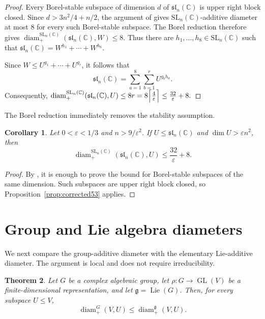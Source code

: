 \documentclass[11pt]{article}
\newtheorem{theorem}{Theorem}[section]
\newtheorem{corollary}[theorem]{Corollary}
\theoremstyle{remark}
\newcommand{\C}{\mathbb C}
\begin{document}
\begin{proof}
Every Borel-stable subspace of dimension $d$ of
$\mathfrak{sl}_n(\C)$ is upper right block closed.  Since
$d>3n^2/4+n/2$, the argument of
\cite[Lemma~5.1 and Proposition~5.2]{JezernikSpenko} gives
$\mathrm{SL}_n(\C)$-additive diameter at most $8$ for every such
Borel-stable subspace.  The Borel reduction
\cite[Proposition~2.3]{JezernikSpenko} therefore gives $\operatorname{diam}^{\mathrm{SL}_n(\C)}_{+}
 (\mathfrak{sl}_n(\C),W)\leq8.$
Thus there are $h_1,\ldots,h_8\in\mathrm{SL}_n(\C)$ such that $\mathfrak{sl}_n(\C)=W^{h_1}+\cdots+W^{h_8}.$

Since $W\leq U^{g_1}+\cdots+U^{g_r}$, it follows that
\[
 \mathfrak{sl}_n(\C)
=
 \sum_{a=1}^{8}\sum_{b=1}^{r}U^{g_bh_a}.
\]
Consequently, $\operatorname{diam}^{\mathrm{SL}_n(\C)}_{+}
 (\mathfrak{sl}_n(\C),U)
 \leq 8r
 =8\Bigl\lceil\frac4\varepsilon\Bigr\rceil
 \leq\frac{32}{\varepsilon}+8.$
\end{proof}

The Borel reduction immediately removes the stability assumption.

\begin{corollary}\label{cor:allsubspaces}
Let $0<\varepsilon<1/3$ and $n>9/\varepsilon^2$.  If
$U\leq\mathfrak{sl}_n(\C)$ and $\dim U>\varepsilon n^2$, then
\[
 \operatorname{diam}^{\mathrm{SL}_n(\C)}_{+}
 (\mathfrak{sl}_n(\C),U)
 \leq\frac{32}{\varepsilon}+8.
\]
\end{corollary}

\begin{proof}
By \cite[Proposition~2.3]{JezernikSpenko}, it is enough to prove the
bound for Borel-stable subspaces of the same dimension.  Such subspaces are
upper right block closed, so Proposition~\ref{prop:corrected53} applies.
\end{proof}

\section{Group and Lie algebra diameters}

We next compare the group-additive diameter with the elementary Lie-additive
diameter.  The argument is local and does not require irreducibility.

\begin{theorem}\label{thm:rightineq}
Let $G$ be a complex algebraic group, let
$\rho:G\to\operatorname{GL}(V)$ be a finite-dimensional representation,
and let $\mathfrak g=\operatorname{Lie}(G)$. Then, for every subspace
$U\leq V$,
\[
 \operatorname{diam}^{G}_{+}(V,U)
 \leq
 \operatorname{diam}^{\mathfrak g}_{+}(V,U).
\]
\end{theorem}
\end{document}

